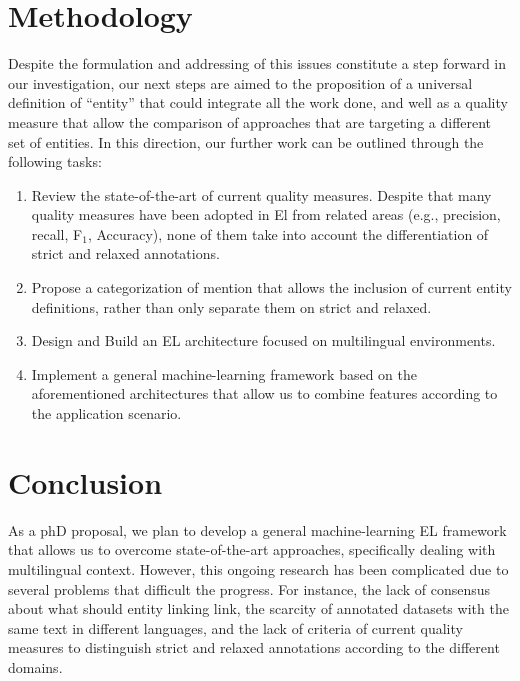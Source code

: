 \documentclass[sigconf]{acmart}
\begin{document}
\section{Methodology}

Despite the formulation and addressing of this issues constitute a step forward in our investigation, our next steps are aimed to the proposition of a universal definition of ``entity'' that could integrate all the work done, and well as a quality measure that allow the comparison of approaches that are targeting a different set of entities. In this direction, our further work can be outlined through the following tasks:

\begin{enumerate}
    \item Review the state-of-the-art of current quality measures. Despite that many quality measures have been adopted in El from related areas (e.g., precision, recall, F$_1$, Accuracy), none of them take into account the differentiation of strict and relaxed annotations. 
    
    \item Propose a categorization of mention that allows the inclusion of current entity definitions, rather than only separate them on strict and relaxed.
    \item Design and Build an EL architecture focused on multilingual environments.
    \item Implement a general machine-learning framework based on the aforementioned architectures that allow us to combine features according to the application scenario.
    
    
\end{enumerate}


\section{Conclusion}

As a phD proposal, we plan to develop a general machine-learning EL framework that allows us to overcome state-of-the-art approaches, specifically dealing with multilingual context. However, this ongoing research has been complicated due to several problems that difficult the progress. For instance, the lack of consensus about what should entity linking link, the scarcity of annotated datasets with the same text in different languages, and the lack of criteria of current quality measures to distinguish strict and relaxed annotations according to the different domains. 
\end{document}

